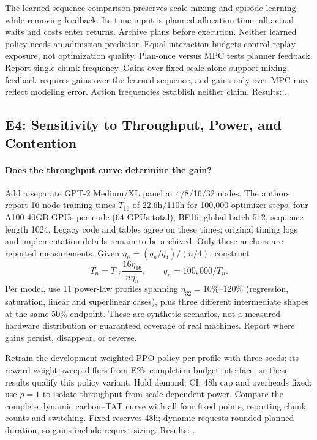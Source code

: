 The learned-sequence comparison preserves scale mixing and episode learning
while removing feedback. Its time input is planned allocation time; all actual
waits and costs enter returns. Archive plans before execution. Neither learned
policy needs an admission predictor. Equal interaction budgets control replay
exposure, not optimization quality. Plan-once versus MPC tests planner feedback.
Report single-chunk frequency. Gains over fixed scale alone support mixing;
feedback requires gains over the learned sequence, and gains only over MPC
may reflect modeling error. Action frequencies establish neither claim.
Results: .

\subsection{E4: Sensitivity to Throughput, Power, and Contention}

\paragraph{Does the throughput curve determine the gain?}
Add a separate GPT-2 Medium/XL panel at 4/8/16/32 nodes. The authors report
16-node training times $T_{16}$ of 22.6h/110h for 100,000 optimizer steps:
four A100 40GB GPUs per node (64 GPUs total), BF16, global batch 512,
sequence length 1024. Legacy code and tables agree on these times; original
timing logs and implementation details remain to be archived. Only these
anchors are reported measurements. Given $\eta_n=(q_n/q_4)/(n/4)$, construct
\begin{equation}
 T_n=T_{16}\frac{16\eta_{16}}{n\eta_n},\qquad q_n=100{,}000/T_n.
 \label{eq:scaling_sensitivity}
\end{equation}
Per model, use 11 power-law profiles spanning $\eta_{32}=10\%$--$120\%$
(regression, saturation, linear and superlinear cases), plus three different
intermediate shapes at the same 50\% endpoint. These are synthetic scenarios,
not a measured hardware distribution or guaranteed coverage of real machines.
Report where gains persist, disappear, or reverse.

Retrain the development weighted-PPO policy per profile with three seeds;
its reward-weight sweep differs from E2's completion-budget interface, so
these results qualify this policy variant. Hold demand, CI, 48h cap and
overheads fixed; use $\rho=1$ to isolate throughput from scale-dependent
power. Compare the complete dynamic carbon--TAT curve with all four fixed
points, reporting chunk counts and switching. Fixed reserves 48h; dynamic
requests rounded planned duration, so gains include request sizing.
Results: .

